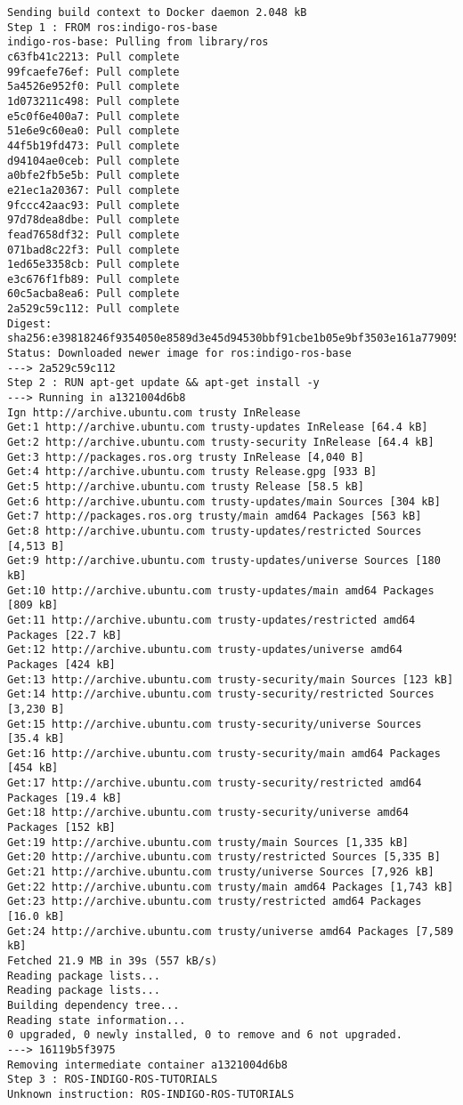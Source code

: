 	\begin{lstlisting}[style=consola]
Sending build context to Docker daemon 2.048 kB
Step 1 : FROM ros:indigo-ros-base
indigo-ros-base: Pulling from library/ros
c63fb41c2213: Pull complete 
99fcaefe76ef: Pull complete 
5a4526e952f0: Pull complete 
1d073211c498: Pull complete 
e5c0f6e400a7: Pull complete 
51e6e9c60ea0: Pull complete 
44f5b19fd473: Pull complete 
d94104ae0ceb: Pull complete 
a0bfe2fb5e5b: Pull complete 
e21ec1a20367: Pull complete 
9fccc42aac93: Pull complete 
97d78dea8dbe: Pull complete 
fead7658df32: Pull complete 
071bad8c22f3: Pull complete 
1ed65e3358cb: Pull complete 
e3c676f1fb89: Pull complete 
60c5acba8ea6: Pull complete 
2a529c59c112: Pull complete 
Digest: sha256:e39818246f9354050e8589d3e45d94530bbf91cbe1b05e9bf3503e161a779095
Status: Downloaded newer image for ros:indigo-ros-base
---> 2a529c59c112
Step 2 : RUN apt-get update && apt-get install -y
---> Running in a1321004d6b8
Ign http://archive.ubuntu.com trusty InRelease
Get:1 http://archive.ubuntu.com trusty-updates InRelease [64.4 kB]
Get:2 http://archive.ubuntu.com trusty-security InRelease [64.4 kB]
Get:3 http://packages.ros.org trusty InRelease [4,040 B]
Get:4 http://archive.ubuntu.com trusty Release.gpg [933 B]
Get:5 http://archive.ubuntu.com trusty Release [58.5 kB]
Get:6 http://archive.ubuntu.com trusty-updates/main Sources [304 kB]
Get:7 http://packages.ros.org trusty/main amd64 Packages [563 kB]
Get:8 http://archive.ubuntu.com trusty-updates/restricted Sources [4,513 B]
Get:9 http://archive.ubuntu.com trusty-updates/universe Sources [180 kB]
Get:10 http://archive.ubuntu.com trusty-updates/main amd64 Packages [809 kB]
Get:11 http://archive.ubuntu.com trusty-updates/restricted amd64 Packages [22.7 kB]
Get:12 http://archive.ubuntu.com trusty-updates/universe amd64 Packages [424 kB]
Get:13 http://archive.ubuntu.com trusty-security/main Sources [123 kB]
Get:14 http://archive.ubuntu.com trusty-security/restricted Sources [3,230 B]
Get:15 http://archive.ubuntu.com trusty-security/universe Sources [35.4 kB]
Get:16 http://archive.ubuntu.com trusty-security/main amd64 Packages [454 kB]
Get:17 http://archive.ubuntu.com trusty-security/restricted amd64 Packages [19.4 kB]
Get:18 http://archive.ubuntu.com trusty-security/universe amd64 Packages [152 kB]
Get:19 http://archive.ubuntu.com trusty/main Sources [1,335 kB]
Get:20 http://archive.ubuntu.com trusty/restricted Sources [5,335 B]
Get:21 http://archive.ubuntu.com trusty/universe Sources [7,926 kB]
Get:22 http://archive.ubuntu.com trusty/main amd64 Packages [1,743 kB]
Get:23 http://archive.ubuntu.com trusty/restricted amd64 Packages [16.0 kB]
Get:24 http://archive.ubuntu.com trusty/universe amd64 Packages [7,589 kB]
Fetched 21.9 MB in 39s (557 kB/s)
Reading package lists...
Reading package lists...
Building dependency tree...
Reading state information...
0 upgraded, 0 newly installed, 0 to remove and 6 not upgraded.
---> 16119b5f3975
Removing intermediate container a1321004d6b8
Step 3 : ROS-INDIGO-ROS-TUTORIALS 
Unknown instruction: ROS-INDIGO-ROS-TUTORIALS
	\end{lstlisting}

